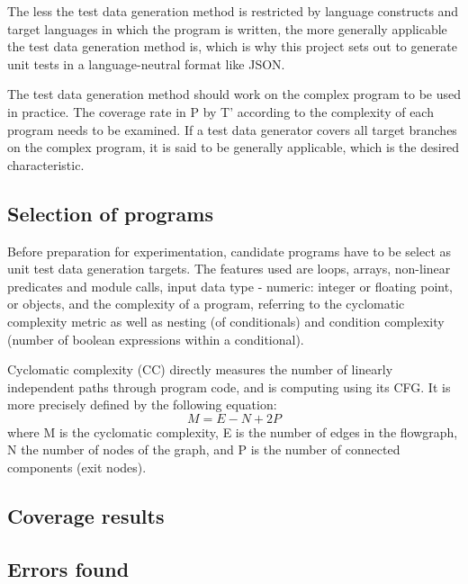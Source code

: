 \documentclass{icldt}
\numberwithin{equation}{section}       %
\begin{document}
{The less the test data generation method is restricted by language constructs and target languages in which the program is written, the more generally applicable the test data generation method is, which is why this project sets out to generate unit tests in a language-neutral format like JSON.

The test data generation method should work on the complex program to be used in practice. The coverage rate in P by T' according to the complexity of each program needs to be examined. If a test data generator covers all target branches on the complex program, it is said to be generally applicable, which is the desired characteristic.

\subsection{Selection of programs}
Before preparation for experimentation, candidate programs have to be select as unit test data generation targets. The features used are loops, arrays, non-linear predicates and module calls, input data type - numeric: integer or floating point, or objects, and the complexity of a program, referring to the cyclomatic complexity metric as well as nesting (of conditionals) and condition complexity (number of boolean expressions within a conditional).

Cyclomatic complexity (CC) directly measures the number of linearly independent paths through program code, and is computing using its CFG. It is more precisely defined by the following equation:
$$
	M = E - N + 2P
$$
where M is the cyclomatic complexity, E is the number of edges in the flowgraph, N the number of nodes of the graph, and P is the number of connected components (exit nodes).

\subsection{Coverage results}

\subsection{Errors found}


}
\end{document}

